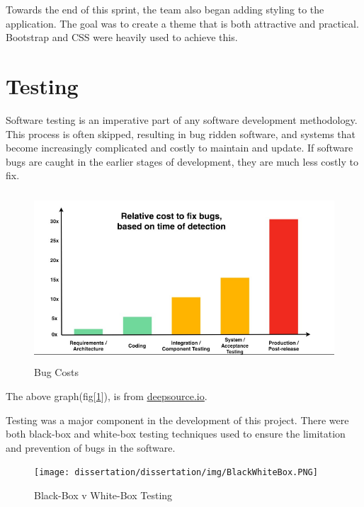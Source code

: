 Towards the end of this sprint, the team also began adding styling to the application. The goal was to create a theme that is both attractive and practical. Bootstrap and CSS were heavily used to achieve this.
\section{Testing}
\label{sec:MethodologyTesting}
Software testing is an imperative part of any software development methodology\cite{ammann2016introduction}. This process is often skipped, resulting in bug ridden software, and systems that become increasingly complicated and costly to maintain and update. If software bugs are caught in the earlier stages of development, they are much less costly to fix. 

\bigskip

\begin{figure}[h]
    \centering
    \includegraphics[width=\textwidth, height=180pt]{BugCosts.PNG}
    \caption{Bug Costs}
    \label{fig:bugCosts}
\end{figure}


\bigskip

The above graph(fig[\ref{fig:bugCosts}]), is from \href{https://deepsource.io/blog/exponential-cost-of-fixing-bugs/}{\underline{deepsource.io}}.

Testing was a major component in the development of this project. There were both black-box and white-box testing techniques used to ensure the limitation and prevention of bugs in the software. 

\bigskip

\begin{figure}[H]
    \centering
    \texttt{[image: dissertation/dissertation/img/BlackWhiteBox.PNG]}
    \caption{Black-Box v White-Box Testing}
    \label{fig:whiteBox}
\end{figure}

